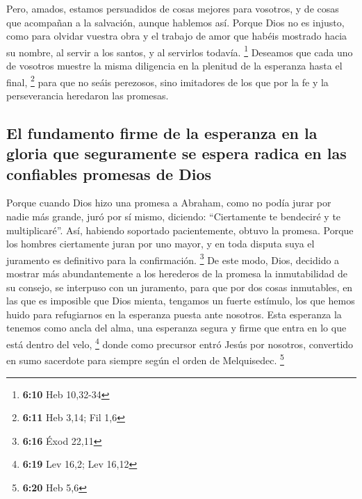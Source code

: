 \begin{paracol}{2}
 Pero, amados, estamos persuadidos de cosas mejores para
vosotros, y de cosas que acompañan a la salvación, aunque hablemos así.
 Porque Dios no es injusto, como para olvidar vuestra
obra y el trabajo de amor que habéis mostrado hacia su nombre, al servir
a los santos, y al servirlos todavía. \footnote{\textbf{6:10} Heb
  10,32-34}  Deseamos que cada uno de vosotros muestre la
misma diligencia en la plenitud de la esperanza hasta el final,
\footnote{\textbf{6:11} Heb 3,14; Fil 1,6}  para que no
seáis perezosos, sino imitadores de los que por la fe y la perseverancia
heredaron las promesas.

\hypertarget{el-fundamento-firme-de-la-esperanza-en-la-gloria-que-seguramente-se-espera-radica-en-las-confiables-promesas-de-dios}{%
\subsection{El fundamento firme de la esperanza en la gloria que
seguramente se espera radica en las confiables promesas de
Dios}\label{el-fundamento-firme-de-la-esperanza-en-la-gloria-que-seguramente-se-espera-radica-en-las-confiables-promesas-de-dios}}

 Porque cuando Dios hizo una promesa a Abraham, como no
podía jurar por nadie más grande, juró por sí mismo, 
diciendo: ``Ciertamente te bendeciré y te multiplicaré''.
 Así, habiendo soportado pacientemente, obtuvo la
promesa.  Porque los hombres ciertamente juran por uno
mayor, y en toda disputa suya el juramento es definitivo para la
confirmación. \footnote{\textbf{6:16} Éxod 22,11}  De
este modo, Dios, decidido a mostrar más abundantemente a los herederos
de la promesa la inmutabilidad de su consejo, se interpuso con un
juramento,  para que por dos cosas inmutables, en las que
es imposible que Dios mienta, tengamos un fuerte estímulo, los que hemos
huido para refugiarnos en la esperanza puesta ante nosotros.
 Esta esperanza la tenemos como ancla del alma, una
esperanza segura y firme que entra en lo que está dentro del velo,
\footnote{\textbf{6:19} Lev 16,2; Lev 16,12}  donde como
precursor entró Jesús por nosotros, convertido en sumo sacerdote para
siempre según el orden de Melquisedec. \footnote{\textbf{6:20} Heb 5,6}

\switchcolumn
\begin{otherlanguage}{english}


\end{otherlanguage}
\end{paracol}
